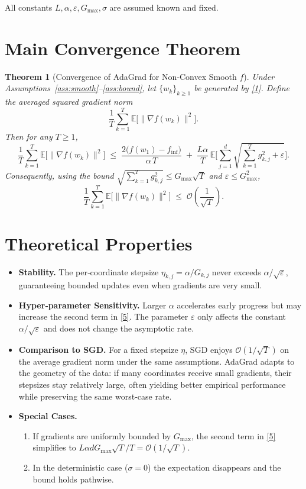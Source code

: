 \documentclass{article}
\newtheorem{theorem}{Theorem}
\newcommand{\E}{\mathbb{E}}
\begin{document}
All constants $L,\alpha,\varepsilon,G_{\max},\sigma$ are assumed known and fixed.

\section*{Main Convergence Theorem}
\begin{theorem}[Convergence of AdaGrad for Non‑Convex Smooth $f$]\label{thm:main}
Under Assumptions~\ref{ass:smooth}--\ref{ass:bound}, let $\{w_k\}_{k\ge1}$ be generated by \eqref{1}.  
Define the averaged squared gradient norm
\[
\frac{1}{T}\sum_{k=1}^{T}\E\!\big[\|\nabla f(w_k)\|^{2}\big].
\]
Then for any $T\ge1$,
\[
\boxed{
\frac{1}{T}\sum_{k=1}^{T}\E\!\big[\|\nabla f(w_k)\|^{2}\big]
\;\le\;
\frac{2\big(f(w_1)-f_{\inf}\big)}{\alpha\,T}
\;+\;
\frac{L\alpha}{T}\,
\E\!\Bigg[\sum_{j=1}^{d}\sqrt{\sum_{k=1}^{T}g_{k,j}^{2}+\varepsilon}\Bigg].
}
\tag{5}
\]
Consequently, using the bound $\sqrt{\sum_{k=1}^{T}g_{k,j}^{2}}\le G_{\max}\sqrt{T}$ and $\varepsilon\le G_{\max}^{2}$,
\[
\frac{1}{T}\sum_{k=1}^{T}\E\!\big[\|\nabla f(w_k)\|^{2}\big]
\;\le\;
\mathcal{O}\!\left(\frac{1}{\sqrt{T}}\right).
\tag{6}
\]
\end{theorem}

\section*{Theoretical Properties}
\begin{itemize}
\item \textbf{Stability.} The per‑coordinate stepsize $\eta_{k,j}= \alpha/ G_{k,j}$ never exceeds $\alpha/\sqrt{\varepsilon}$, guaranteeing bounded updates even when gradients are very small.
\item \textbf{Hyper‑parameter Sensitivity.} Larger $\alpha$ accelerates early progress but may increase the second term in \eqref{5}. The parameter $\varepsilon$ only affects the constant $\alpha/\sqrt{\varepsilon}$ and does not change the asymptotic rate.
\item \textbf{Comparison to SGD.} For a fixed stepsize $\eta$, SGD enjoys $\mathcal{O}(1/\sqrt{T})$ on the average gradient norm under the same assumptions. AdaGrad adapts to the geometry of the data: if many coordinates receive small gradients, their stepsizes stay relatively large, often yielding better empirical performance while preserving the same worst‑case rate.
\item \textbf{Special Cases.} 
    \begin{enumerate}
        \item If gradients are uniformly bounded by $G_{\max}$, the second term in \eqref{5} simplifies to $L\alpha d G_{\max}\sqrt{T}/T = \mathcal{O}(1/\sqrt{T})$.
        \item In the deterministic case ($\sigma=0$) the expectation disappears and the bound holds pathwise.
    \end{enumerate}
\end{itemize}
\end{document}
